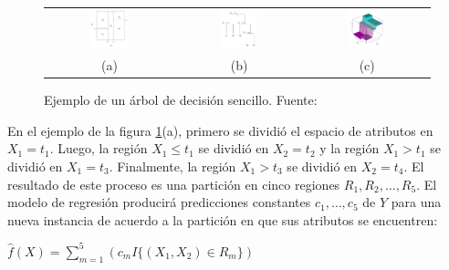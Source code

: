 \begin{figure}[h!]
\begin{tabular}{ccc}
  \includegraphics[width=0.32\textwidth]{Kap1/cart1.png} &     \includegraphics[width=0.32\textwidth]{Kap1/cart2.png} &
    \includegraphics[width=0.32\textwidth]{Kap1/cart3.png}
    \\
(a)  & (b) & (c) 
\end{tabular}
\caption{Ejemplo de un árbol de decisión sencillo. Fuente: \protect\cite{statisticallearning} }
\label{fig:arboles_hastie_1}
\end{figure}

En el ejemplo de la figura  \ref{fig:arboles_hastie_1}(a), primero se dividió el espacio de atributos en $X_1 = t_1$. Luego, la región $X_1 \leq t_1$ se dividió en $X_2 = t_2$ y la región $X_1 > t_1$ se dividió en $X_1 = t_3$. Finalmente, la región $X_1 > t_3$ se dividió en $X_2 = t_4$. El resultado de este proceso es una partición en cinco regiones $R_1, R_2, \ldots, R_5$. El modelo de regresión producirá predicciones constantes $c_1, \ldots, c_5$ de $Y$ para una nueva instancia de acuerdo a la partición en que sus atributos se encuentren:

\begin{center}
$\hat{f}(X) = \sum\limits_{m=1}^5 ( c_m I\{(X_1,X_2) \in R_m\} )$
\end{center}

